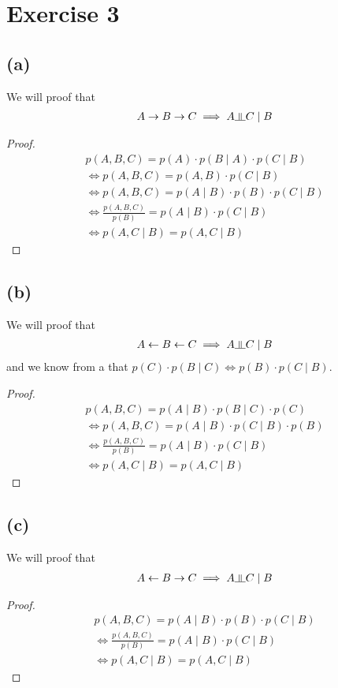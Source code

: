 \documentclass{article}
\newcommand{\dsep}{\rotatebox[origin=c]{90}{$\models$}}
\begin{document}
\section*{Exercise 3}
\subsection*{(a)}
We will proof that 
\begin{align*}
    A \rightarrow B \rightarrow C \implies A \dsep C \mid B
\end{align*}
\begin{proof}
\begin{align*}
	p(A,B,C) = p(A) \cdot p(B \mid A) \cdot p(C\mid B) \\
	\Leftrightarrow p(A,B,C) = p(A, B) \cdot p(C\mid B) \\
	\Leftrightarrow p(A,B,C) = p(A\mid B) \cdot p(B) \cdot p(C\mid B) \\
	\Leftrightarrow \frac{p(A,B,C)}{p(B)} = p(A\mid B) \cdot p(C\mid B) \\
	\Leftrightarrow p(A,C \mid B) = p(A, C \mid B)
\end{align*}
\end{proof}

\subsection*{(b)}
We will proof that 
\begin{align*}
    A \leftarrow B \leftarrow C \implies A \dsep C \mid B
\end{align*}
and we know from a that $p(C) \cdot p(B \mid C) \Leftrightarrow p(B) \cdot p(C \mid B)$.
\begin{proof}
\begin{align*}
	p(A,B,C) = p(A \mid B) \cdot p(B \mid C) \cdot p(C) \\
	\Leftrightarrow p(A,B,C) = p(A\mid B) \cdot p(C\mid B) \cdot p(B) \\
	\Leftrightarrow \frac{p(A,B,C)}{p(B)} = p(A\mid B) \cdot p(C\mid B) \\
	\Leftrightarrow p(A,C \mid B) = p(A, C \mid B)
\end{align*}
\end{proof}

\subsection*{(c)}
We will proof that 
\begin{align*}
    A \leftarrow B \rightarrow C \implies A \dsep C \mid B
\end{align*}
\begin{proof}
\begin{align*}
	p(A,B,C) = p(A \mid B) \cdot p(B) \cdot p(C \mid B)  \\
	\Leftrightarrow \frac{p(A,B,C)}{p(B)} = p(A\mid B) \cdot p(C\mid B) \\
	\Leftrightarrow p(A,C \mid B) = p(A, C \mid B)
\end{align*}
\end{proof}
\end{document}
